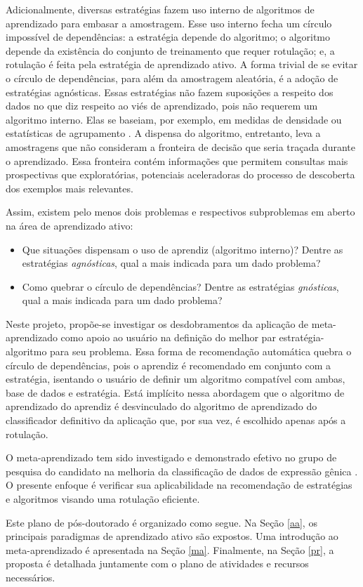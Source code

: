 Adicionalmente, diversas estratégias fazem uso interno de algoritmos de aprendizado para
embasar a amostragem.
Esse uso interno fecha um círculo impossível de dependências:
a estratégia depende do algoritmo; o algoritmo depende da existência do conjunto
de treinamento que requer rotulação; e,
a rotulação é feita pela estratégia de aprendizado ativo.
A forma trivial de se evitar o círculo de dependências, para além da amostragem aleatória,
é a adoção de estratégias agnósticas.
Essas estratégias não fazem suposições a respeito dos dados no que diz respeito ao viés de
aprendizado, pois não requerem um algoritmo interno.
Elas se baseiam, por exemplo, em medidas de densidade ou estatísticas de agrupamento
\citep{journals/tcs/Dasgupta11}.
A dispensa do algoritmo, entretanto, leva a amostragens que não consideram a fronteira
de decisão que seria traçada durante o aprendizado.
Essa fronteira contém informações que permitem consultas mais prospectivas que exploratórias,
potenciais aceleradoras do processo de descoberta dos exemplos mais relevantes.

Assim, existem pelo menos dois problemas e respectivos subproblemas em aberto na área
de aprendizado ativo:
\begin{itemize}
 \item Que situações dispensam o uso de aprendiz (algoritmo interno)?
 Dentre as estratégias \textit{agnósticas}, qual a mais indicada para um dado problema?
 \item Como quebrar o círculo de dependências?
 Dentre as estratégias \textit{gnósticas}, qual a mais indicada para um dado problema?
\end{itemize}

Neste projeto, propõe-se investigar os desdobramentos da aplicação de meta-aprendizado como apoio ao usuário
na definição do melhor par estratégia-algoritmo para seu problema.
Essa forma de recomendação automática quebra o círculo de dependências, pois o aprendiz é recomendado em
conjunto com a estratégia, isentando o usuário de definir um algoritmo compatível com
ambas, base de dados e estratégia.
Está implícito nessa abordagem que o algoritmo de aprendizado do aprendiz é desvinculado
do algoritmo de aprendizado do classificador definitivo da aplicação que, por sua vez, é escolhido apenas após a rotulação.

O meta-aprendizado tem sido investigado e demonstrado efetivo no grupo de pesquisa
do candidato na melhoria da classificação de dados de expressão gênica
\cite{souza2010c,souza2010b,souza2009,1442541}.
O presente enfoque é verificar sua aplicabilidade na recomendação de estratégias e algoritmos visando uma rotulação eficiente.

 Este plano de pós-doutorado é organizado como segue.
 Na Seção \ref{aa}, os principais paradigmas de aprendizado ativo são expostos.
Uma introdução ao meta-aprendizado é apresentada na Seção \ref{ma}.
Finalmente, na Seção \ref{pr}, a proposta é detalhada juntamente com o plano de atividades e recursos necessários.
